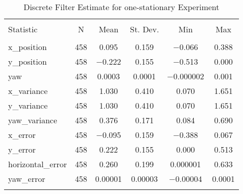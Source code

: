 
\begin{table}[h] \centering 
  \caption{Discrete Filter Estimate for one-stationary Experiment} 
  \label{tab:one_stationary_discrete_summary} 
\begin{tabular}{@{\extracolsep{5pt}}lccccc} 
\\[-1.8ex]\hline 
\hline \\[-1.8ex] 
Statistic & \multicolumn{1}{c}{N} & \multicolumn{1}{c}{Mean} & \multicolumn{1}{c}{St. Dev.} & \multicolumn{1}{c}{Min} & \multicolumn{1}{c}{Max} \\ 
\hline \\[-1.8ex] 
x\_position & 458 & \num{0.095} & \num{0.159} & $-$0.066 & \num{0.388} \\ 
y\_position & 458 & $-$0.222 & \num{0.155} & $-$0.513 & \num{0.000} \\ 
yaw & 458 & \num{0.0003} & \num{0.0001} & $-$0.000002 & \num{0.001} \\ 
x\_variance & 458 & \num{1.030} & \num{0.410} & \num{0.070} & \num{1.651} \\ 
y\_variance & 458 & \num{1.030} & \num{0.410} & \num{0.070} & \num{1.651} \\ 
yaw\_variance & 458 & \num{0.376} & \num{0.171} & \num{0.084} & \num{0.690} \\ 
x\_error & 458 & $-$0.095 & \num{0.159} & $-$0.388 & \num{0.067} \\ 
y\_error & 458 & \num{0.222} & \num{0.155} & \num{0.000} & \num{0.513} \\ 
horizontal\_error & 458 & \num{0.260} & \num{0.199} & \num{0.000001} & \num{0.633} \\ 
yaw\_error & 458 & \num{0.00001} & \num{0.00003} & $-$0.00004 & \num{0.0001} \\ 
\hline \\[-1.8ex] 
\end{tabular} 
\end{table} 
